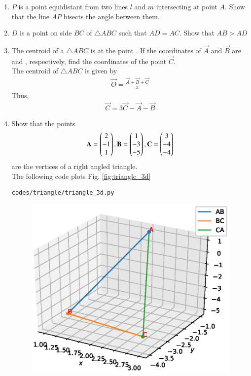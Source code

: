 \begin{enumerate}[label=\arabic*.,ref=\thesubsection.\theenumi]
%
\item $P$ is a point equidistant from two lines $l$ and $m$ intersecting at point $A$.  Show that the line  $AP$  bisects the angle between them.
%
\item $D$ is a point on side $BC$ of $\triangle  ABC$ such that $AD = AC$. Show that $AB > AD$
%
%
\item The centroid of a $\triangle ABC$ is at the point .  If the coordinates of $\vec{A}$ and $\vec{B}$ are  and , respectively, find the coordinates of the point $\vec{C}$.
%
\\
\solution The centroid of $\triangle ABC$ is given by
\begin{align}
\label{eq:tri_geo_ex_centroid}
\vec{O} = \frac{\vec{A}+\vec{B}+\vec{C}}{3}
\end{align}
%
Thus, 
\begin{align}
\vec{C} = 3\vec{C}-\vec{A}-\vec{B}
\end{align}
%
\item Show that the points 
\begin{align}
\mathbf{A} = \begin{pmatrix}2\\-1 \\1\end{pmatrix},
\mathbf{B} = \begin{pmatrix}1\\-3 \\-5\end{pmatrix},
\mathbf{C} = \begin{pmatrix}3\\ -4\\-4\end{pmatrix}
\end{align}
%
are the vertices of a right angled triangle.
\\
\solution 
The following code plots Fig. \ref{fig:triangle_3d}
%
\begin{lstlisting}
codes/triangle/triangle_3d.py
\end{lstlisting}
%
\begin{figure}[!ht]
\includegraphics[width=\columnwidth]{./triangle/figs/triangle_3d.eps}

\end{figure}
\end{enumerate}

